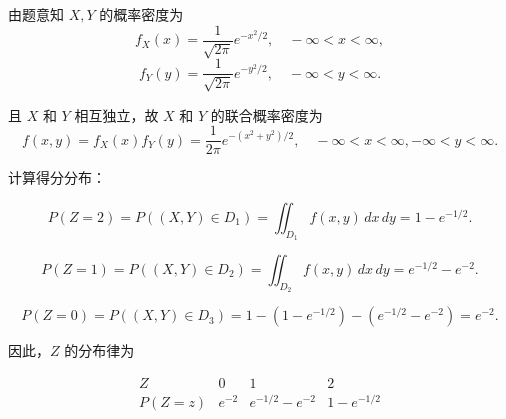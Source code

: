 \documentclass[twoside]{article}
\begin{document}
\begin{ans}{19}{19}
    由题意知 \( X, Y \) 的概率密度为
    \[
    f_X(x) = \frac{1}{\sqrt{2\pi}} e^{-x^2/2}, \quad -\infty < x < \infty,
    \]
    \[
    f_Y(y) = \frac{1}{\sqrt{2\pi}} e^{-y^2/2}, \quad -\infty < y < \infty.
    \]
    
    且 \( X \) 和 \( Y \) 相互独立，故 \( X \) 和 \( Y \) 的联合概率密度为
    \[
    f(x, y) = f_X(x) f_Y(y) = \frac{1}{2\pi} e^{-(x^2 + y^2)/2}, \quad -\infty < x < \infty, -\infty < y < \infty.
    \]
    
    计算得分分布：
    
    \[
    P(Z = 2) = P((X, Y) \in D_1) = \iint_{D_1} f(x, y) \, dx \, dy = 1 - e^{-1/2}.
    \]
    
    \[
    P(Z = 1) = P((X, Y) \in D_2) = \iint_{D_2} f(x, y) \, dx \, dy = e^{-1/2} - e^{-2}.
    \]
    
    \[
    P(Z = 0) = P((X, Y) \in D_3) = 1 - (1 - e^{-1/2}) - (e^{-1/2} - e^{-2}) = e^{-2}.
    \]
    
    因此，\( Z \) 的分布律为
    
    \[
    \begin{array}{c|c|c|c}
    Z & 0 & 1 & 2 \\
    \hline
    P(Z = z) & e^{-2} & e^{-1/2} - e^{-2} & 1 - e^{-1/2} \\
    \end{array}
    \]
\end{ans}
\end{document}
